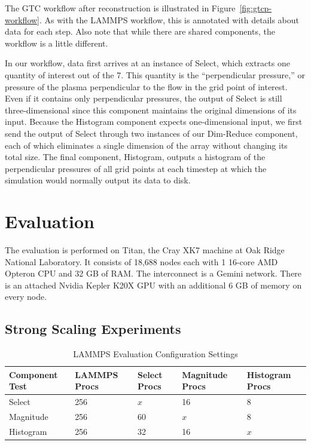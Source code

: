 \documentclass[conference]{IEEEtran}
\begin{document}
The GTC workflow after reconstruction is illustrated in
Figure~\ref{fig:gtcp-workflow}. As with the LAMMPS workflow, this is annotated
with details about data for each step. Also note that while there are shared
components, the workflow is a little different.

In our workflow, data first arrives at an instance of Select, which extracts
one quantity of interest out of the 7. This quantity is the ``perpendicular
pressure,'' or pressure of the plasma perpendicular to the flow in the grid
point of interest. Even if it contains only perpendicular pressures, the output
of Select is still three-dimensional since this component maintains the
original dimensions of its input. Because the Histogram component expects
one-dimensional input, we first send the output of Select through two instances
of our Dim-Reduce component, each of which eliminates a single dimension of the
array without changing its total size. The final component, Histogram, outputs
a histogram of the perpendicular pressures of all grid points at each timestep
at which the simulation would normally output its data to disk.

\section{Evaluation}
\label{s:eval}

The evaluation is performed on Titan, the Cray XK7 machine at Oak Ridge
National Laboratory. It consists of 18,688 nodes each with 1 16-core AMD
Opteron CPU and 32 GB of RAM. The interconnect is a Gemini network. There is an
attached Nvidia Kepler K20X GPU with an additional 6 GB of memory on every
node.


\subsection{Strong Scaling Experiments}

\begin{table}[tbp]
\centering
\caption{LAMMPS Evaluation Configuration Settings}
\label{tab:eval-strong-lammps}
\begin{tabular}{|l|l|l|l|l|}
\hline
Component Test & LAMMPS Procs & Select Procs & Magnitude Procs & Histogram Procs \\
\hline
Select & 256 & $x$ & 16 & 8\\
\hline
Magnitude & 256 & 60 & $x$ & 8\\
\hline
Histogram & 256 & 32 & 16 & $x$\\
\hline
\end{tabular}
\end{table}
\end{document}
